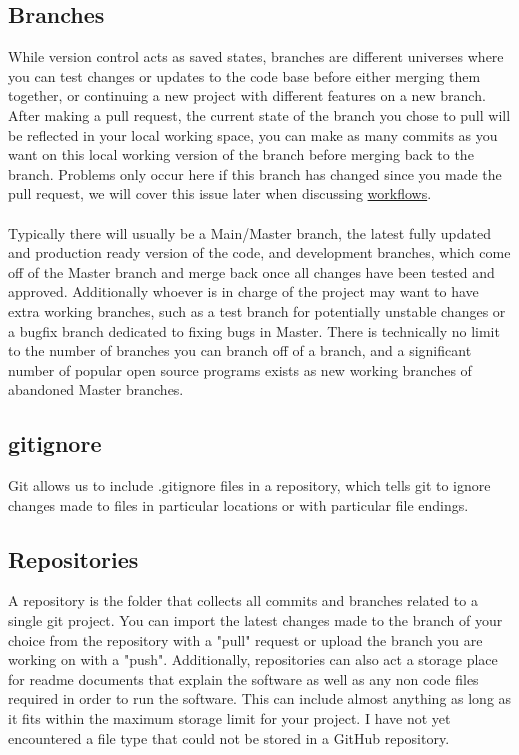 \documentclass{article}
\begin{document}
\subsection{Branches}
While version control acts as saved states, branches are different universes where you can test changes or updates to the code base before either merging them together, or continuing a new project with different features on a new branch. After making a pull request, the current state of the branch you chose to pull will be reflected in your local working space, you can make as many commits as you want on this local working version of the branch before merging back to the branch. Problems only occur here if this branch has changed since you made the pull request, we will cover this issue later when discussing \hyperref[workflows]{workflows}.

\paragraph{}

Typically there will usually be a Main/Master branch, the latest fully updated and production ready version of the code, and development branches, which come off of the Master branch and merge back once all changes have been tested and approved. Additionally whoever is in charge of the project may want to have extra working branches, such as a test branch for potentially unstable changes or a bugfix branch dedicated to fixing bugs in Master. There is technically no limit to the number of branches you can branch off of a branch, and a significant number of popular open source programs exists as new working branches of abandoned Master branches.

\subsection{gitignore}
Git allows us to include .gitignore files in a repository, which tells git to ignore changes made to files in particular locations or with particular file endings. 

\subsection{Repositories}
A repository is the folder that collects all commits and branches related to a single git project. You can import the latest changes made to the branch of your choice from the repository with a "pull" request or upload the branch you are working on with a "push". Additionally, repositories can also act a storage place for readme documents that explain the software as well as any non code files required in order to run the software. This can include almost anything as long as it fits within the maximum storage limit for your project. I have not yet encountered a file type that could not be stored in a GitHub repository.
\end{document}
